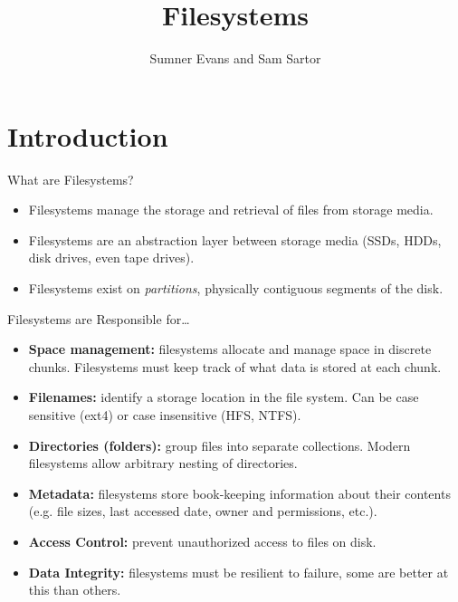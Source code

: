 \documentclass{lug}
\title{Filesystems}
\author{Sumner Evans and Sam Sartor}
\institute{Mines Linux Users Group}
\begin{document}
\section{Introduction}

\begin{frame}{What are Filesystems?}
    \begin{itemize}
        \item Filesystems manage the storage and retrieval of files from storage
            media.
        \item Filesystems are an abstraction layer between storage media (SSDs,
            HDDs, disk drives, even tape drives).
        \item Filesystems exist on \textit{partitions}, physically contiguous
            segments of the disk.
    \end{itemize}
\end{frame}

\begin{frame}{Filesystems are Responsible for\ldots}
    \begin{itemize}
        \item \textbf{Space management:} filesystems allocate and manage space
            in discrete chunks. Filesystems must keep track of what data is
            stored at each chunk.
        \item \textbf{Filenames:} identify a storage location in the file
            system. Can be case sensitive (ext4) or case insensitive (HFS,
            NTFS).
        \item \textbf{Directories (folders):} group files into separate
            collections. Modern filesystems allow arbitrary nesting of
            directories.
        \item \textbf{Metadata:} filesystems store book-keeping information
            about their contents (e.g. file sizes, last accessed date, owner and
            permissions, etc.).
        \item \textbf{Access Control:} prevent unauthorized access to files on
            disk.
        \item \textbf{Data Integrity:} filesystems must be resilient to failure,
            some are better at this than others.
    \end{itemize}
\end{frame}
\end{document}
